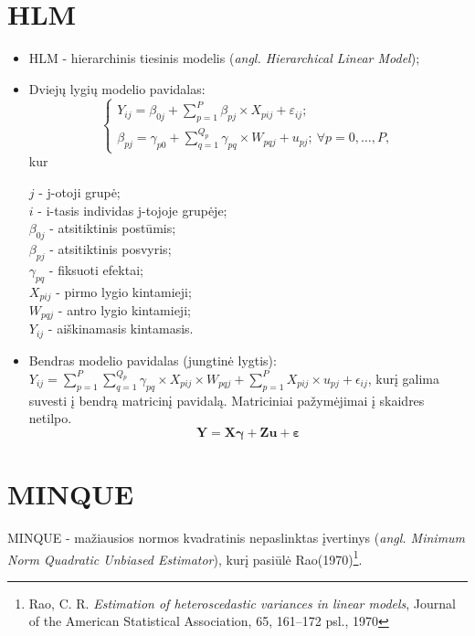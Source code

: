 \documentclass[12pt,a4paper]{article}
\begin{document}
\section{HLM}
\begin{itemize}
\item HLM - hierarchinis tiesinis modelis (\textit{angl. Hierarchical Linear Model});
\item Dviejų lygių modelio pavidalas: 
\[ \left\{
  \begin{array}{l}
    Y_{ij} = \beta_{0j}+\sum^P_{p = 1} \beta_{pj}\times X_{pij}+\varepsilon_{ij}; \\
    \beta_{pj} = \gamma_{p0} + \sum^{Q_p}_{q=1}\gamma_{pq}\times W_{pqj}+u_{pj};\ \forall p = 0 , \dots, P,
  \end{array} \right.\]
kur\\
\begin{scriptsize}
$j$ - j-otoji grupė;\\
$i$ - i-tasis individas j-tojoje grupėje;\\
$\beta_{0j}$ - atsitiktinis postūmis;\\
$\beta_{pj}$ - atsitiktinis posvyris;\\
$\gamma_{pq}$ - fiksuoti efektai;\\
$X_{pij}$ - pirmo lygio kintamieji;\\
$W_{pqj}$ - antro lygio kintamieji;\\
$Y_{ij}$ - aiškinamasis kintamasis.
\end{scriptsize}
\small
\item Bendras modelio pavidalas (jungtinė lygtis): $ Y_{ij} =\sum^P_{p = 1} \sum^{Q_p}_{q=1}\gamma_{pq}\times X_{pij}\times W_{pqj}+\sum^P_{p = 1} X_{pij}\times u_{pj}+\epsilon_{ij}$, kurį galima suvesti į bendrą matricinį pavidalą. Matriciniai pažymėjimai į skaidres netilpo.
\begin{equation}
\mathbf{Y}=\mathbf{X}\boldsymbol{\gamma}+\mathbf{Z}\mathbf{u}+\boldsymbol{\varepsilon}
\end{equation}
\end{itemize}

\section{MINQUE}

\indent MINQUE - mažiausios normos kvadratinis nepaslinktas įvertinys (\textit{angl. Minimum Norm Quadratic Unbiased Estimator}), kurį pasiūlė Rao(1970)\footnote{Rao, C. R.  \textit{Estimation of heteroscedastic variances in linear models}, Journal of the American Statistical Association, 65, 161–172 psl., 1970}.\\
 
\end{document}
